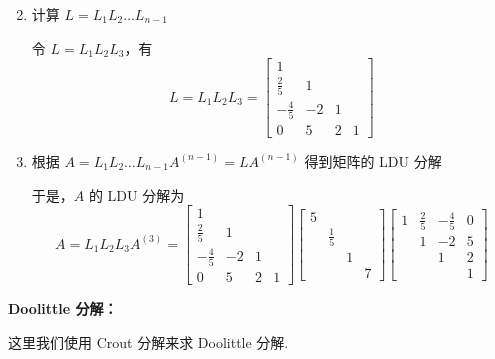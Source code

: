 \begin{solution}
\begin{enumerate}
\begin{equation*}
                        \end{equation*}
                    \item 计算 $L = L_{1}L_{2} \dots L_{n-1}$
                        \par 令 $L = L_1L_2L_3$，有
                        \begin{equation*}
                            L = L_1L_2L_3 = \begin{bmatrix}
                                1 & & & \\ \frac{2}{5} & 1 & & \\ -\frac{4}{5} & -2 & 1 & \\ 0 & 5 & 2 & 1
                            \end{bmatrix}
                        \end{equation*}
                    \item 根据 $A = L_{1}L_{2} \dots L_{n-1}A^{(n-1)} = LA^{(n-1)}$ 得到矩阵的 LDU 分解
                        \par 于是，$A$ 的 LDU 分解为
                        \begin{equation*}
                            A = L_1L_2L_3A^{(3)} = \begin{bmatrix}
                                1 & & & \\ \frac{2}{5} & 1 & & \\ -\frac{4}{5} & -2 & 1 & \\ 0 & 5 & 2 & 1
                            \end{bmatrix}\begin{bmatrix}
                                5 & & & \\ & \frac{1}{5} & & \\ & & 1 & \\ & & & 7
                            \end{bmatrix}\begin{bmatrix}
                                1 & \frac{2}{5} & -\frac{4}{5} & 0 \\ & 1 & -2 & 5 \\ & & 1 & 2 \\ & & & 1
                            \end{bmatrix}
                        \end{equation*}
                \end{enumerate}
                \textbf{Doolittle 分解：}
                \par 这里我们使用 Crout 分解来求 Doolittle 分解.
                \begin{enumerate}

\end{enumerate}
\end{solution}
